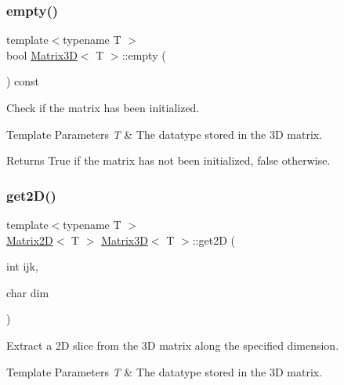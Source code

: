\subsubsection{\texorpdfstring{empty()}{empty()}}
{\footnotesize\ttfamily template$<$typename T $>$ \\
bool \mbox{\hyperlink{classMatrix3D}{Matrix3D}}$<$ T $>$\+::empty (\begin{DoxyParamCaption}{ }\end{DoxyParamCaption}) const}



Check if the matrix has been initialized. 


\begin{DoxyTemplParams}{Template Parameters}
{\em T} & The datatype stored in the 3D matrix. \\
\hline
\end{DoxyTemplParams}
\begin{DoxyReturn}{Returns}
True if the matrix has not been initialized, false otherwise. 
\end{DoxyReturn}
\mbox{\label{classMatrix3D_ac5c77248be46bfef323f0229f6e0a59c}} 
\subsubsection{\texorpdfstring{get2\+D()}{get2D()}}
{\footnotesize\ttfamily template$<$typename T $>$ \\
\mbox{\hyperlink{classMatrix2D}{Matrix2D}}$<$ T $>$ \mbox{\hyperlink{classMatrix3D}{Matrix3D}}$<$ T $>$\+::get2D (\begin{DoxyParamCaption}\item[{int}]{ijk,  }\item[{char}]{dim }\end{DoxyParamCaption})}



Extract a 2D slice from the 3D matrix along the specified dimension. 


\begin{DoxyTemplParams}{Template Parameters}
{\em T} & The datatype stored in the 3D matrix. \\
\hline
\end{DoxyTemplParams}


